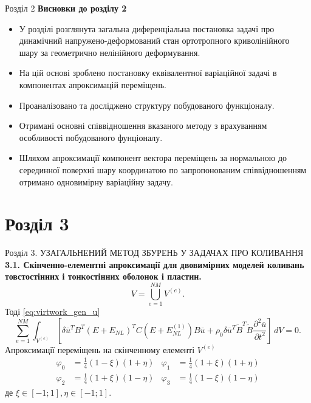 \documentclass[8pt]{beamer}
\numberwithin{figure}{section}
\numberwithin{equation}{section}
\numberwithin{table}{section}
\begin{document}
\begin{frame}{Розділ 2}
\textbf{Висновки до розділу 2}\\
\vspace{1em}
\begin{itemize}
\item У розділі розглянута загальна диференціальна постановка задачі про динамічний напружено-деформований стан ортотропного криволінійного шару за геометрично нелінійного деформування.
\item На цій основі зроблено постановку еквівалентної варіаційної задачі в компонентах апроксимацій переміщень.
\item Проаналізовано та досліджено структуру побудованого функціоналу.
\item Отримані основні співвідношення вказаного методу з врахуванням особливості побудованого фунціоналу.
\item Шляхом апроксимації компонент вектора переміщень за нормальною до серединної поверхні шару координатою по запропонованим співвідношенням отримано одновимірну варіаційну задачу. 
\end{itemize}

\end{frame}

\section{Розділ 3}
\begin{frame}{Розділ 3. УЗАГАЛЬНЕНИЙ МЕТОД ЗБУРЕНЬ У ЗАДАЧАХ ПРО КОЛИВАННЯ}
\textbf{3.1. Скінченно-елементні апроксимації для двовимірних моделей коливань товстостінних і тонкостінних оболонок і пластин.}
\\
\vspace{1em}
\begin{equation}
V=\bigcup\limits_{e=1}^{NM} V^{(e)}.
\end{equation}
Тоді \eqref{eq:virtwork_gen_u}
\begin{equation}
\sum_{e=1}^{NM}\int_{V^{(e)}}  \left[ \delta\overline{u} ^T B ^T\left( E + E_{NL} \right)^T C \left( E + E_{NL}^{(1)} \right)B \overline{u} + \rho_0 \delta\overline{u} ^T \tilde{B}^T \tilde{B}\frac{\partial^2 \overline{u}}{\partial t ^2} \right] \,dV=0.
\end{equation}
Апроксимації переміщень на скінченному елементі $V^{(e)}$
\begin{equation}
\begin{aligned}
\varphi_0&=\frac{1}{4}\left(1-\xi\right)\left(1+\eta\right) & \varphi_1 &=\frac{1}{4}\left(1+\xi\right)\left(1+\eta\right)\\
\varphi_2&=\frac{1}{4}\left(1+\xi\right)\left(1-\eta\right) & \varphi_3 &=\frac{1}{4}\left(1-\xi\right)\left(1-\eta\right)
\end{aligned}
\end{equation}
де $\xi \in [-1;1], \eta \in [-1;1]$.

\end{frame}
\end{document}
